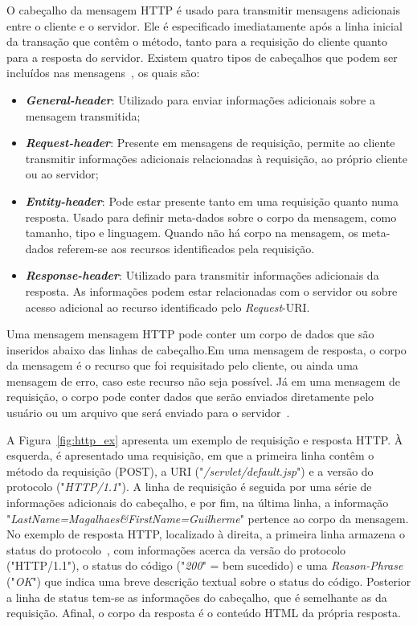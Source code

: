 O cabeçalho da mensagem HTTP é usado para transmitir mensagens adicionais entre o cliente e o servidor. Ele é especificado imediatamente após a linha inicial da transação que contêm o método, tanto para a requisição do cliente quanto para a resposta do servidor. Existem quatro tipos de cabeçalhos que podem ser incluídos nas mensagens~\cite{fielding2014hypertext}, os quais são:
\begin{itemize}
	\item \textbf{\textit{General-header}}: Utilizado para enviar informações adicionais sobre a mensagem transmitida;
	\item \textbf{\textit{Request-header}}: Presente em mensagens de requisição, permite ao cliente transmitir informações adicionais relacionadas à requisição, ao próprio cliente ou ao servidor;
	\item \textbf{\textit{Entity-header}}: Pode estar presente tanto em uma requisição quanto numa resposta. Usado para definir meta-dados sobre o corpo da mensagem, como tamanho, tipo e linguagem. Quando não há corpo na mensagem, os meta-dados referem-se aos recursos identificados pela requisição.
	\item \textbf{\textit{Response-header}}: Utilizado para transmitir informações adicionais da resposta. As informações podem estar relacionadas com o servidor ou sobre acesso adicional ao recurso identificado pelo \textit{Request}-URI.  
\end{itemize}

Uma mensagem mensagem HTTP pode conter um corpo de dados que são inseridos abaixo das linhas de cabeçalho.Em uma mensagem de resposta, o corpo da mensagem é o recurso que foi requisitado pelo cliente, ou ainda uma mensagem de erro, caso este recurso não seja possível. Já em uma mensagem de requisição, o corpo pode conter dados que serão enviados diretamente pelo usuário ou um arquivo que será enviado para o servidor~\cite{fielding2014hypertext}.

A Figura~\ref{fig:http_ex} apresenta um exemplo de requisição e resposta HTTP. À esquerda, é apresentado uma requisição, em que a primeira linha contêm o método da requisição (POST), a URI ("\textit{/servlet/default.jsp}") e a versão do protocolo ("\textit{HTTP/1.1}"). A linha de requisição é seguida por uma série de informações adicionais do cabeçalho, e por fim, na última linha, a informação "\textit{LastName=Magalhaes\&FirstName=Guilherme}" pertence ao corpo da mensagem. No exemplo de resposta HTTP, localizado à direita, a primeira linha armazena o status do protocolo~\cite{fielding2014hypertext}, com informações acerca da versão do protocolo ("HTTP/1.1"), o status do código ("\textit{200}" = bem sucedido) e uma \textit{Reason-Phrase}~\cite{fielding2014hypertext} ("\textit{OK}") que indica uma breve descrição textual sobre o status do código. Posterior a linha de status tem-se as informações do cabeçalho, que é semelhante as da requisição. Afinal, o corpo da resposta é o conteúdo HTML da própria resposta. 

